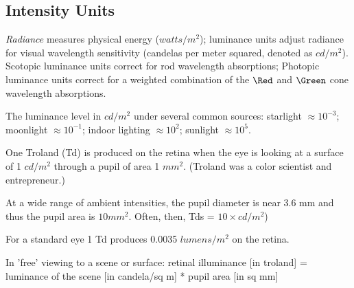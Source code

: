 \subsection*{Intensity Units}

\be

\item {\em Radiance} measures physical energy ($watts / {m ^2}$);
luminance units adjust radiance for visual wavelength sensitivity
(candelas per meter squared, denoted as $cd / {m^2}$).  Scotopic
luminance units correct for rod wavelength absorptions; Photopic
luminance units correct for a weighted combination of the $\Red$ and
$\Green$ cone wavelength absorptions.

\item The luminance level in $cd/m^2$ under several common sources:
starlight $\approx 10^{-3}$; moonlight $ \approx 10^{-1}$; indoor
lighting $\approx 10^2$; sunlight $\approx 10^5$.

\item One Troland (Td) is produced on the retina when the eye is looking at a
surface of 1 $cd/m^2$ through a pupil of area 1 $mm^2$.  (Troland was a
color scientist and entrepreneur.)


%
%

\item At a wide range of ambient intensities, the pupil diameter is
near 3.6 mm and thus the pupil area is $10 mm^2$.  Often, then, Tds =
$10 \times cd / {m^2}$)

\item For a standard eye 1 Td produces 0.0035 $lumens /{m^2}$ on the retina.

\item In 'free' viewing to a scene or surface:  
retinal illuminance [in troland] = 
luminance of the scene [in candela/sq m] * pupil area [in sq mm] 

